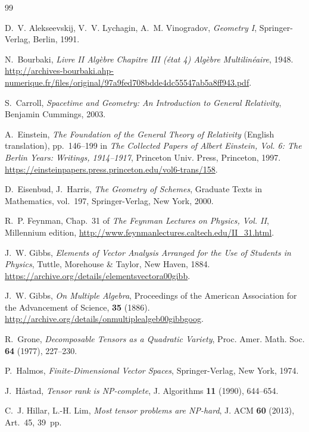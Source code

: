 \begin{thebibliography}{99}

D.~V. Alekseevskij, V.~V. Lychagin, A.~M. Vinogradov, \textit{Geometry I}, Springer-Verlag, Berlin, 1991.

N.~Bourbaki, \textit{Livre II Alg\`ebre Chapitre III (\'etat 4) Alg\`ebre Multilin\'eaire}, 1948. 
\url{http://archives-bourbaki.ahp-numerique.fr/files/original/97a9fed708bdde4dc55547ab5a8ff943.pdf}.

S.~Carroll, \textit{Spacetime and Geometry: An Introduction to General Relativity}, Benjamin Cummings, 2003.

A.~Einstein, \textit{The Foundation of the General Theory of Relativity} (English translation), pp.~146--199 in \textit{The Collected Papers of Albert Einstein, Vol. 6: The Berlin Years: Writings, 1914--1917}, Princeton Univ. Press, Princeton, 1997. 
\url{https://einsteinpapers.press.princeton.edu/vol6-trans/158}.

D.~Eisenbud, J.~Harris, \textit{The Geometry of Schemes}, Graduate Texts in Mathematics, vol.~197, Springer-Verlag, New York, 2000.

R.~P. Feynman, Chap.~31 of \textit{The Feynman Lectures on Physics, Vol. II}, Millennium edition, 
\url{http://www.feynmanlectures.caltech.edu/II_31.html}.

J.~W. Gibbs, \textit{Elements of Vector Analysis Arranged for the Use of Students in Physics}, Tuttle, Morehouse \& Taylor, New Haven, 1884. 
\url{https://archive.org/details/elementsvectora00gibb}.

J.~W. Gibbs, \textit{On Multiple Algebra}, Proceedings of the American Association for the Advancement of Science, \textbf{35} (1886). 
\url{http://archive.org/details/onmultiplealgeb00gibbgoog}.

R.~Grone, \textit{Decomposable Tensors as a Quadratic Variety}, Proc. Amer. Math. Soc. \textbf{64} (1977), 227--230.

P.~Halmos, \textit{Finite-Dimensional Vector Spaces}, Springer-Verlag, New York, 1974.

J.~H\aa stad, \textit{Tensor rank is NP-complete}, J. Algorithms \textbf{11} (1990), 644--654.

C.~J. Hillar, L.-H. Lim, \textit{Most tensor problems are NP-hard}, J. ACM \textbf{60} (2013), Art.~45, 39~pp.


\end{thebibliography}
